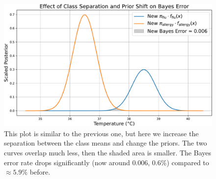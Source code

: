 \begin{figure}[!htp]
    \centering
    \includegraphics[width=\textwidth]{img/bayes-classifier/bayes-error-rate-almost-zero.pdf}
    \caption{This plot is similar to the previous one, but here we increase the separation between the class means and change the priors. The two curves overlap much less, then the shaded area is smaller. The Bayes error rate drops significantly (now around $0.006$, $0.6\%$) compared to $\approx 5.9\%$ before.}
\end{figure}